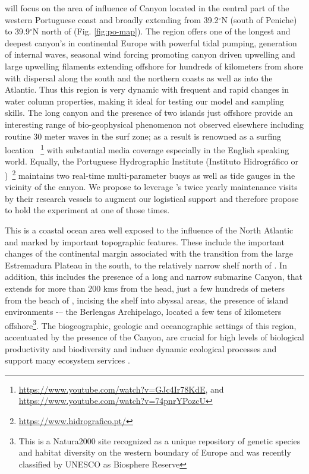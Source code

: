 \proj will focus on the area of influence of \naz Canyon located in
the central part of the western Portuguese coast and broadly extending
from 39.2$^{\circ}$N (south of Peniche) to 39.9$^{\circ}$N north of
\naz (Fig. \ref{fig:po-map}). The region offers one of the longest and
deepest canyon's in continental Europe with powerful tidal pumping,
generation of internal waves, seasonal wind forcing promoting canyon
driven upwelling and large upwelling filaments extending offshore for
hundreds of kilometers from shore with dispersal along the south and
the northern coasts as well as into the Atlantic.  Thus this region is
very dynamic with frequent and rapid changes in water column
properties, making it ideal for testing our model and sampling skills.
The long canyon and the presence of two islands just offshore provide
an interesting range of bio-geophysical phenomenon not observed
elsewhere including routine 30 meter waves in the surf zone; as a
result \naz is renowned as a surfing location
~\footnote{\url{https://www.youtube.com/watch?v=GJc4Ir78KdE}, and
  \url{https://www.youtube.com/watch?v=74pnrYPozcU}} with substantial
media coverage especially in the English speaking world.  Equally, the
Portuguese Hydrographic Institute (Instituto Hidrogr\'{a}fico or
\inste)~\footnote{\url{https://www.hidrografico.pt/}} maintains two
real-time multi-parameter buoys as well as tide gauges in the vicinity
of the canyon. We propose to leverage \inste's twice yearly
maintenance visits by their research vessels to augment our logistical
support and therefore propose to hold the experiment at one of those
times.

This is a coastal ocean area well exposed to the influence of the
North Atlantic and marked by important topographic features. These
include the important changes of the continental margin associated
with the transition from the large Estremadura Plateau in the south,
to the relatively narrow shelf north of \naze. In addition, this
includes the presence of a long and narrow submarine \naz Canyon, that
extends for more than 200 kms from the head, just a few hundreds of
meters from the beach of \naze, incising the shelf into abyssal areas,
the presence of island environments -– the Berlengas Archipelago,
located a few tens of kilometers offshore\footnote{This is a
  Natura2000 site recognized as a unique repository of genetic species
  and habitat diversity on the western boundary of Europe and was
  recently classified by UNESCO as Biosphere Reserve}. The
biogeographic, geologic and oceanographic settings of this region,
accentuated by the presence of the \naz Canyon, are crucial for high
levels of biological productivity and biodiversity and induce dynamic
ecological processes and support many ecosystem services
\cite{tyler09,cunha11}.  

